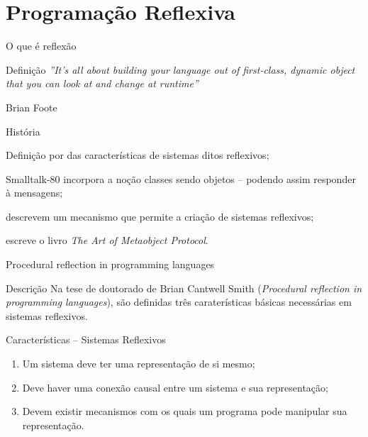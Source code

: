 \documentclass[12pt,t]{beamer}
\begin{document}
 \section{Programação Reflexiva}
	 \begin{frame}{O que é reflexão}
	 	\begin{block}{Definição}
	 		\emph{''It's all about building your language out of first-class, dynamic object that you can look at and change at runtime''}
	 		\begin{flushright}
	 			Brian Foote
	 	\end{flushright} 	 		
	 	\end{block}
	 	\begin{block}{História}
	 		\begin{description}[9999]
	 			\item[1982] Definição por  das características de sistemas ditos reflexivos;
	 			\item[1983] Smalltalk-80 incorpora a noção classes sendo objetos -- podendo assim responder à mensagens;
	 			\item[1984]  descrevem um mecanismo que permite a criação de sistemas reflexivos;
	 			\item[1991]  escreve o livro \emph{The Art of Metaobject Protocol}.
	 		\end{description}
	 	\end{block}	
	 \end{frame}
	 \begin{frame}{Procedural reflection in programming languages \cite{smith1982reflection}}
	 	\begin{block}{Descrição}
	 		Na tese de doutorado de Brian Cantwell Smith (\emph{Procedural reflection in programming languages}), são definidas três caraterísticas básicas necessárias em sistemas reflexivos. 
	 	\end{block}
	 	\begin{block}{Características -- Sistemas Reflexivos}
	 	  \begin{enumerate}
	 	  	\item Um sistema deve ter uma representação de si mesmo;
	 	  	\item Deve haver uma conexão causal entre um sistema e sua representação;
	 	  	\item Devem existir mecanismos com os quais um programa pode manipular sua representação. 
	 	  \end{enumerate}
	 	\end{block}
	 \end{frame}
\end{document}
